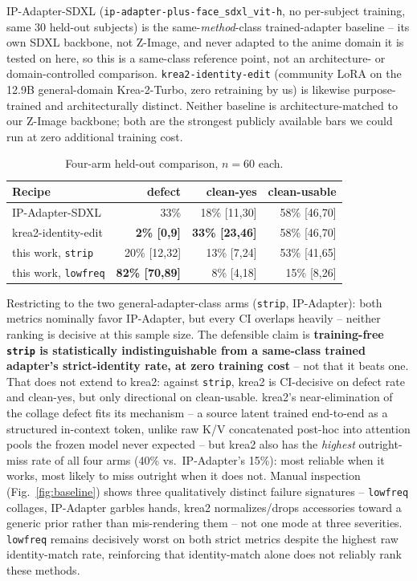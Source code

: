IP-Adapter-SDXL (\texttt{ip-adapter-plus-face\_sdxl\_vit-h}, no per-subject
training, same 30 held-out subjects) is the same-\emph{method}-class
trained-adapter baseline -- its own SDXL backbone, not Z-Image, and never
adapted to the anime domain it is tested on here, so this is a same-class
reference point, not an architecture- or domain-controlled comparison.
\texttt{krea2-identity-edit} (community LoRA on the 12.9B general-domain
Krea-2-Turbo, zero retraining by us) is likewise purpose-trained and
architecturally distinct. Neither baseline is architecture-matched to our
Z-Image backbone; both are the strongest publicly available bars we could
run at zero additional training cost.

\begin{table}[t]
\centering\small
\begin{tabular}{@{}lrrr@{}}
\toprule
Recipe & defect & clean-yes & clean-usable \\
\midrule
IP-Adapter-SDXL & 33\% & 18\% [11,30] & 58\% [46,70] \\
krea2-identity-edit & \textbf{2\% [0,9]} & \textbf{33\% [23,46]} & 58\% [46,70] \\
this work, \texttt{strip} & 20\% [12,32] & 13\% [7,24] & 53\% [41,65] \\
this work, \texttt{lowfreq} & \textbf{82\% [70,89]} & 8\% [4,18] & 15\% [8,26] \\
\bottomrule
\end{tabular}
\caption{Four-arm held-out comparison, $n{=}60$ each.}
\label{tab:baseline}
\end{table}

Restricting to the two general-adapter-class arms (\texttt{strip},
IP-Adapter): both metrics nominally favor IP-Adapter, but every CI
overlaps heavily -- neither ranking is decisive at this sample size. The
defensible claim is \textbf{training-free \texttt{strip} is statistically
indistinguishable from a same-class trained adapter's strict-identity
rate, at zero training cost} -- not that it beats one. That does not
extend to krea2: against \texttt{strip}, krea2 is CI-decisive on defect
rate and clean-yes, but only directional on clean-usable. krea2's
near-elimination of the collage defect fits its mechanism -- a source
latent trained end-to-end as a structured in-context token, unlike raw
K/V concatenated post-hoc into attention pools the frozen model never
expected -- but krea2 also has the \emph{highest} outright-miss rate of
all four arms (40\% vs.\ IP-Adapter's 15\%): most reliable when it
works, most likely to miss outright when it does not. Manual inspection
(Fig.~\ref{fig:baseline}) shows three qualitatively distinct failure
signatures -- \texttt{lowfreq} collages, IP-Adapter garbles hands, krea2
normalizes/drops accessories toward a generic prior rather than
mis-rendering them -- not one mode at three severities. \texttt{lowfreq}
remains decisively worst on both strict metrics despite the highest raw
identity-match rate, reinforcing that
identity-match alone does not reliably rank these methods.


